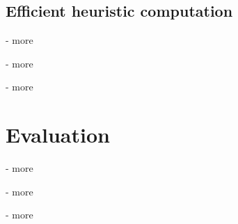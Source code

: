 \subsection{Efficient heuristic computation}
- more

- more

- more



\section{Evaluation}
- more

- more

- more


